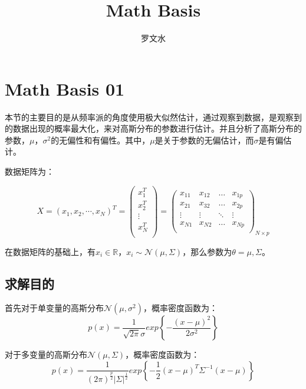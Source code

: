 \documentclass[a4paper]{article}
\title{ Math Basis}
\author{罗文水}
\numberwithin{equation}{section}
\begin{document}
\maketitle
\tableofcontents

\newpage
\section{Math Basis 01}

本节的主要目的是从频率派的角度使用极大似然估计，通过观察到数据，是观察到的数据出现的概率最大化，来对高斯分布的参数进行估计。并且分析了高斯分布的参数，$\mu$，$\sigma^2$的无偏性和有偏性。其中，$\mu$是关于参数的无偏估计，而$\sigma$是有偏估计。

数据矩阵为：

\begin{equation}
    X=(x_1, x_2, \cdots, x_N)^T=
    \begin{pmatrix}
    x_1^T \\ 
    x_2^T \\
    \vdots\\
    x_N^T \\
    \end{pmatrix} =
    \begin{pmatrix}
    x_{11} & x_{12} & \dots & x_{1p}\\
    x_{21} & x_{32} & \dots & x_{2p}\\
    \vdots & \vdots & \ddots & \vdots\\
    x_{N1} & x_{N2} & \dots & x_{Np}\\
    \end{pmatrix}_{N\times p}
\end{equation}

在数据矩阵的基础上，有$x_i \in \mathbb{R}$，$x_i \sim \mathcal{N}(\mu, \Sigma)$，那么参数为$\theta=\mu, \Sigma$。

\subsection{求解目的}
首先对于单变量的高斯分布$\mathcal{N}(\mu,\sigma^2)$，概率密度函数为：
\begin{equation}
    p(x)=\frac{1}{\sqrt{2\pi}\sigma}exp\left\{ -\frac{(x-\mu)^2}{2\sigma^2} \right\}
\end{equation}

对于多变量的高斯分布$\mathcal{N}(\mu,\Sigma)$，概率密度函数为：
\begin{equation}
    p(x)=\frac{1}{(2\pi)^{\frac{p}{2}}|\Sigma|^{\frac{1}{2}}}exp\left\{ -\frac{1}{2}(x-\mu)^T\Sigma^{-1}(x-\mu) \right\}
\end{equation}
\end{document}
